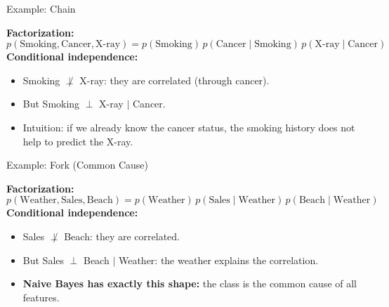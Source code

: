 \documentclass[aspectratio=169]{beamer}
\begin{document}
\begin{frame}{Example: Chain}
\centering
{}

\vspace{0.3cm}
\raggedright
\textbf{Factorization:}
\[
  p(\text{Smoking}, \text{Cancer}, \text{X-ray}) = p(\text{Smoking})\, p(\text{Cancer}\mid\text{Smoking})\, p(\text{X-ray}\mid\text{Cancer})
\]
\textbf{Conditional independence:}
\begin{itemize}
  \item Smoking $\not\perp$ X-ray: they are correlated (through cancer).
  \item But Smoking $\perp$ X-ray $\mid$ Cancer.
  \item Intuition: if we already know the cancer status, the smoking history does not help to predict the X-ray.
\end{itemize}
\end{frame}

\begin{frame}{Example: Fork (Common Cause)}
\centering
{}

\vspace{0.2cm}
\raggedright
\textbf{Factorization:}
\[
  p(\text{Weather}, \text{Sales}, \text{Beach}) = p(\text{Weather})\, p(\text{Sales}\mid\text{Weather})\, p(\text{Beach}\mid\text{Weather})
\]
\textbf{Conditional independence:}
\begin{itemize}
  \item Sales $\not\perp$ Beach: they are correlated.
  \item But Sales $\perp$ Beach $\mid$ Weather: the weather explains the correlation.
  \item \textbf{Naive Bayes has exactly this shape:} the class is the common cause of all features.
\end{itemize}
\end{frame}
\end{document}
